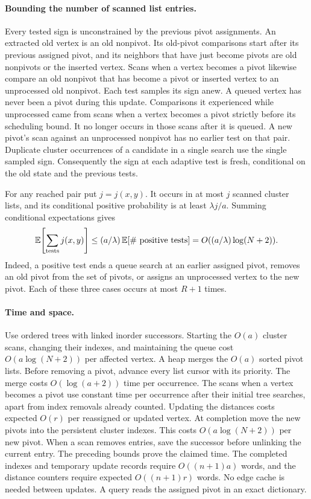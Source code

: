\documentclass[11pt]{article}
\begin{document}
\paragraph{Bounding the number of scanned list entries.}
Every tested sign is unconstrained by the previous pivot assignments. An extracted
old vertex is an old nonpivot. Its old-pivot comparisons start after its
previous assigned pivot, and its neighbors that have just become pivots are old nonpivots or the
inserted vertex. Scans when a vertex becomes a pivot likewise compare an old
nonpivot that has become a pivot or inserted vertex to an unprocessed old nonpivot. Each test samples its sign
anew. A queued vertex has never been a
pivot during this update.
Comparisons it experienced while unprocessed came from scans when a vertex becomes a pivot
strictly before its scheduling bound. It no longer occurs in those
scans after it is queued. A new pivot's scan against an unprocessed nonpivot
has no earlier test on that pair. Duplicate cluster occurrences of a
candidate in a single search use the single sampled sign. Consequently
the sign at each adaptive test is fresh, conditional on the old state
and the previous tests.

For any reached pair put $j=j(x,y)$. It occurs in at most $j$ scanned
cluster lists, and its conditional positive probability is at least
$\lambda j/a$. Summing conditional expectations gives
\[
 \mathbb E\!\left[\sum_{\rm tests}j(x,y)\right]
 \le(a/\lambda)\,\mathbb E[\#\text{ positive tests}]
 =O((a/\lambda)\log(N+2)).
\]
Indeed, a positive test ends a queue search at an earlier assigned pivot,
removes an old pivot from the set of pivots, or assigns an unprocessed vertex to the new
pivot. Each of these three cases occurs at most $R+1$ times.

\paragraph{Time and space.}
Use ordered trees with linked inorder successors. Starting the
$O(a)$ cluster scans, changing their indexes, and maintaining the queue
cost $O(a\log(N+2))$ per affected vertex. A heap merges the $O(a)$
sorted pivot lists. Before removing a pivot, advance every list cursor
with its priority. The merge costs $O(\log(a+2))$ time per occurrence. The
scans when a vertex becomes a pivot use constant time per occurrence after their
initial tree searches, apart from index removals already counted.
Updating the distances costs expected $O(r)$ per reassigned or
updated vertex. At completion move the new pivots into
the persistent cluster indexes. This costs
$O(a\log(N+2))$ per new pivot. When a scan removes entries, save
the successor before unlinking the current entry. The preceding bounds prove the claimed time. The
completed indexes and temporary update records require $O((n+1)a)$
words, and the distance counters require expected $O((n+1)r)$
words. No edge cache is needed between updates. A query reads the
assigned pivot in an exact dictionary.
\end{document}
